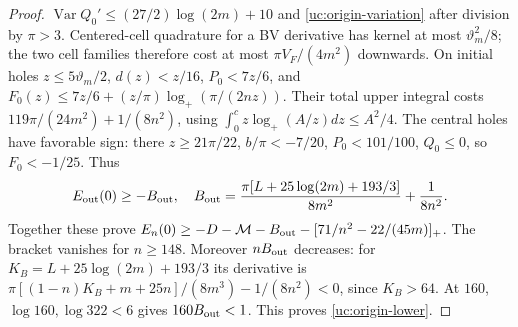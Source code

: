 \begin{proof}
$\operatorname{Var}Q_0'\leq(27/2)\log(2m)+10$ and
\eqref{uc:origin-variation} after division by $\pi>3$.
Centered-cell quadrature for a BV derivative has kernel at most
$\vartheta_m^2/8$; the two cell families therefore cost at most
$\pi V_F/(4m^2)$ downwards. On initial holes $z\leq5\vartheta_m/2$,
$d(z)<z/16$, $P_0<7z/6$, and
$F_0(z)\leq7z/6+(z/\pi)\log_+(\pi/(2nz))$.
Their total upper integral costs
$119\pi/(24m^2)+1/(8n^2)$, using
$\int_0^c z\log_+(A/z)dz\leq A^2/4$.
The central holes have favorable sign: there $z\geq21\pi/22$,
$b/\pi<-7/20$, $P_0<101/100$, $Q_0\leq0$, so $F_0<-1/25$.
Thus
\[
 E_{\rm out}(0)\geq-B_{\rm out},\quad
 B_{\rm out}=\frac{\pi[L+25\log(2m)+193/3]}{8m^2}+\frac1{8n^2}.
\]
Together these prove
$E_n(0)\geq-D-\mathcal M-B_{\rm out}-[71/n^2-22/(45m)]_+$.
The bracket vanishes for $n\geq148$. Moreover $nB_{\rm out}$ decreases:
for $K_B=L+25\log(2m)+193/3$ its derivative is
$\pi[(1-n)K_B+m+25n]/(8m^3)-1/(8n^2)<0$, since $K_B>64$.
At $160$, $\log160,\log322<6$ gives $160B_{\rm out}<1$.
This proves \eqref{uc:origin-lower}.


\end{proof}
